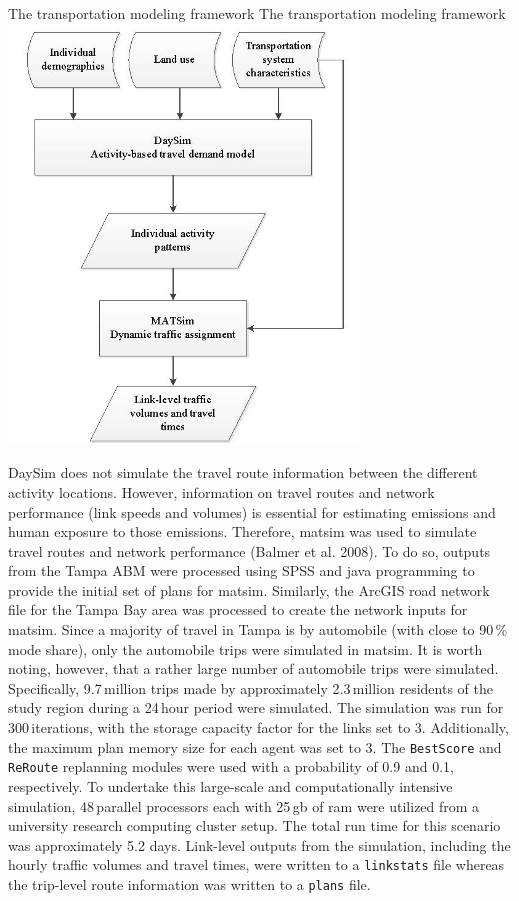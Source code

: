 \createfigure%
{The transportation modeling framework}%
{The transportation modeling framework}%
{\label{fig:tampa-fig2}}%
{\includegraphics[width=0.7\textwidth, angle=0]{./scenarios/figures/tampa-fig2.jpg}}%
{}

DaySim does not simulate the travel route information between the different activity locations. However, information on travel routes and network performance (\ie link speeds and volumes) is essential for estimating emissions and human exposure to those emissions. Therefore, \gls{matsim} was used to simulate travel routes and network performance \citep[][]{}(Balmer et al. 2008). To do so, outputs from the Tampa ABM were processed using SPSS and \gls{java} programming to provide the initial set of plans for \gls{matsim}. Similarly, the ArcGIS road network file for the Tampa Bay area was processed to create the network inputs for \gls{matsim}. Since a majority of travel in Tampa is by automobile (with close to 90\,\% mode share), only the automobile trips were simulated in \gls{matsim}. It is worth noting, however, that a rather large number of automobile trips were simulated. Specifically, 9.7\,million trips made by approximately 2.3\,million residents of the study region during a 24\,hour period were simulated. The simulation was run for 300\,iterations, with the storage capacity factor for the links set to 3. Additionally, the maximum plan memory size for each agent was set to 3. The \lstinline|BestScore| and \lstinline|ReRoute| replanning modules were used with a probability of 0.9 and 0.1, respectively. To undertake this large-scale and computationally intensive simulation, 48\,parallel processors each with 25\,\gls{gb} of \gls{ram} were utilized from a university research computing cluster setup. The total run time for this scenario was approximately 5.2 days. Link-level outputs from the simulation, including the hourly traffic volumes and travel times, were written to a \lstinline|linkstats| file whereas the trip-level route information was written to a \lstinline|plans| file.

